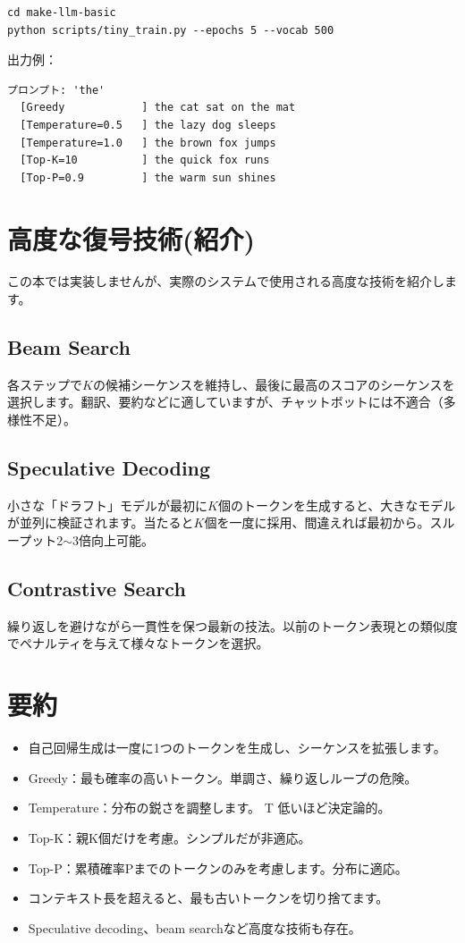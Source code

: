 \begin{lstlisting}[style=bashstyle]
cd make-llm-basic
python scripts/tiny_train.py --epochs 5 --vocab 500
\end{lstlisting}

出力例：
\begin{lstlisting}[basicstyle=\ttfamily\footnotesize, backgroundcolor=\color{codebg}, frame=single]
プロンプト: 'the'
  [Greedy            ] the cat sat on the mat
  [Temperature=0.5   ] the lazy dog sleeps
  [Temperature=1.0   ] the brown fox jumps
  [Top-K=10          ] the quick fox runs
  [Top-P=0.9         ] the warm sun shines
\end{lstlisting}

\section{高度な復号技術(紹介)}

この本では実装しませんが、実際のシステムで使用される高度な技術を紹介します。

\subsection{Beam Search}
各ステップで$K$の候補シーケンスを維持し、最後に最高のスコアのシーケンスを選択します。翻訳、要約などに適していますが、チャットボットには不適合（多様性不足）。

\subsection{Speculative Decoding}
小さな「ドラフト」モデルが最初に$K$個のトークンを生成すると、大きなモデルが並列に検証されます。当たると$K$個を一度に採用、間違えれば最初から。スループット2$\sim$3倍向上可能。

\subsection{Contrastive Search}
繰り返しを避けながら一貫性を保つ最新の技法。以前のトークン表現との類似度でペナルティを与えて様々なトークンを選択。

\section{要約}

\begin{itemize}
\item 自己回帰生成は一度に1つのトークンを生成し、シーケンスを拡張します。
\item Greedy：最も確率の高いトークン。単調さ、繰り返しループの危険。
\item Temperature：分布の鋭さを調整します。 T 低いほど決定論的。
\item Top-K：親K個だけを考慮。シンプルだが非適応。
\item Top-P：累積確率Pまでのトークンのみを考慮します。分布に適応。
\item コンテキスト長を超えると、最も古いトークンを切り捨てます。
\item Speculative decoding、beam searchなど高度な技術も存在。
\end{itemize}

